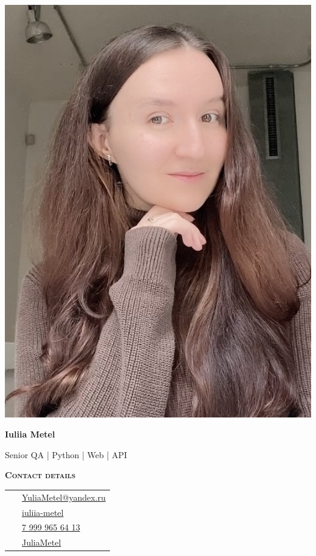 \documentclass[11pt, a4paper]{article}
\newcommand{\headleft}[1]{\vspace*{2ex}\textsc{\textbf{#1}}\par%
	\vspace*{-1.5ex}\hrulefill\par\vspace*{0.7ex}}
\begin{document}
	
	\setlength{\topskip}{0pt}
	\setlength{\parindent}{0pt}
	\setlength{\parskip}{0pt}
	\setlength{\fboxsep}{0pt}
	\pagestyle{empty}
	\raggedbottom
	
	\begin{minipage}[t]{0.33\textwidth} %
		\colorbox{cvblue!90}{\color{white}  %
			\textwidth\relax%
			\begin{minipage}[t][297mm][t]{0.82\textwidth}
				\raggedright
				\vspace*{2ex} %
				\null\hfill\includegraphics[height=1\textwidth]{avatar.jpeg}\hfill\null

				
				\vspace*{1.5ex}
				
				\Large  \textbf{Iuliia Metel} \normalsize 
				
				\vspace*{1.5ex}
				
				Senior QA | Python | Web | API
				
				\headleft{Contact details}
				\vspace*{1ex}
				\begin{tabular}{ @{}c l }
					\Letter\ & \href{mailto:YuliaMetel@yandex.ru?subject=Job Opportunity}{YuliaMetel@yandex.ru} \\
					\faLinkedin\ & \href{https://www.linkedin.com/in/iuliia-metel}{iuliia-metel} \\
					\faMobile*\ & \href{tel:+7 999 965 64 13}{\raisebox{0.2ex}{+}7 999 965 64 13} \\
					\faGithub\ & \href{https://github.com/JuliaMetel}{JuliaMetel} \\
				\end{tabular}
				

\end{minipage}}
\end{minipage}
\end{document}
